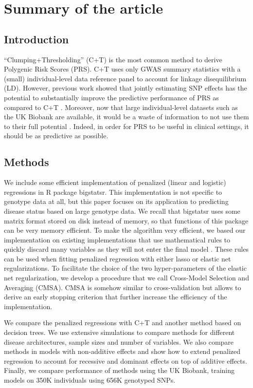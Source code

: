 \section{Summary of the article}

\subsection{Introduction}

``Clumping+Thresholding'' (C+T) is the most common method to derive Polygenic Risk Scores (PRS). C+T uses only GWAS summary statistics with a (small) individual-level data reference panel to account for linkage disequilibrium (LD). 
However, previous work showed that jointly estimating SNP effects has the potential to substantially improve the predictive performance of PRS as compared to C+T \cite[]{abraham2013performance}.
Moreover, now that large individual-level datasets such as the UK Biobank are available, it would be a waste of information to not use them to their full potential \cite[]{bycroft2017genome}.
Indeed, in order for PRS to be useful in clinical settings, it should be as predictive as possible.

\subsection{Methods}

We include some efficient implementation of penalized (linear and logistic) regressions in R package bigstatsr. 
This implementation is not specific to genotype data at all, but this paper focuses on its application to predicting disease status based on large genotype data.
We recall that bigstatsr uses some matrix format stored on disk instead of memory, so that functions of this package can be very memory efficient.
To make the algorithm very efficient, we based our implementation on existing implementations that use mathematical rules to quickly discard many variables as they will not enter the final model \cite[]{tibshirani2012strong}.
These rules can be used when fitting penalized regression with either lasso or elastic net regularizations.
To facilitate the choice of the two hyper-parameters of the elastic net regularization, we develop a procedure that we call Cross-Model Selection and Averaging (CMSA).
CMSA is somehow similar to cross-validation but allows to derive an early stopping criterion that further increase the efficiency of the implementation.

We compare the penalized regressions with C+T and another method based on decision trees. We use extensive simulations to compare methods for different disease architectures, sample sizes and number of variables. We also compare methods in models with non-additive effects and show how to extend penalized regression to account for recessive and dominant effects on top of additive effects. Finally, we compare performance of methods using the UK Biobank, training models on 350K individuals using 656K genotyped SNPs.

